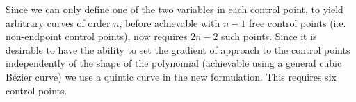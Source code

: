 Since we can only define one of the two variables in each control point, to yield arbitrary curves of order $n$, before achievable with $n - 1$ free control points (i.e. non-endpoint control points), now requires $2n - 2$ such points. Since it is desirable to have the ability to set the gradient of approach to the control points independently of the shape of the polynomial (achievable using a general cubic Bézier curve) we use a quintic curve in the new formulation. This requires six control points.